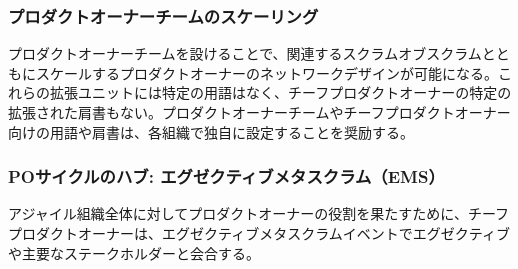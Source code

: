 \documentclass[12pt,a4paper,parskip=full]{scrartcl}
\begin{document}

\subsubsection{プロダクトオーナーチームのスケーリング}\label{scaling-the-product-owner-team}

プロダクトオーナーチームを設けることで、関連するスクラムオブスクラムとともにスケールするプロダクトオーナーのネットワークデザインが可能になる。これらの拡張ユニットには特定の用語はなく、チーフプロダクトオーナーの特定の拡張された肩書もない。プロダクトオーナーチームやチーフプロダクトオーナー向けの用語や肩書は、各組織で独自に設定することを奨励する。

\subsubsection{POサイクルのハブ: エグゼクティブメタスクラム（EMS）}\label{the-hub-of-the-po-cycle}

アジャイル組織全体に対してプロダクトオーナーの役割を果たすために、チーフプロダクトオーナーは、エグゼクティブメタスクラムイベントでエグゼクティブや主要なステークホルダーと会合する。
\end{document}
